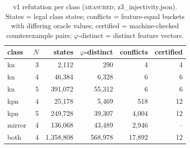 \documentclass[conference]{IEEEtran}
\newcommand{\tierm}{\textsc{measured}}
\begin{document}
\begin{table}[t]
\caption{v1 refutation per class (\tierm{};
z3\_injectivity.json). States = legal class states; conflicts = feature-equal
buckets with differing oracle values; certified = machine-checked
counterexample pairs; $\varphi$-distinct = distinct feature vectors.}
\label{tab:v1}
\centering
\footnotesize
\setlength{\tabcolsep}{3.2pt}
\begin{tabular}{lrrrrr}
\toprule
class & $N$ & states & $\varphi$-distinct & conflicts & certified \\
\midrule
kn     & 3 & 2{,}112 & 290 & 4 & 4 \\
kn     & 4 & 46{,}384 & 6{,}328 & 6 & 6 \\
kn     & 5 & 391{,}072 & 55{,}312 & 6 & 6 \\
kpn    & 4 & 25{,}178 & 5{,}469 & 518 & 12 \\
kpn    & 5 & 249{,}728 & 39{,}307 & 4{,}004 & 12 \\
mirror & 4 & 136{,}068 & 43{,}489 & 2{,}946 & -- \\
both   & 4 & 1{,}358{,}808 & 568{,}978 & 17{,}892 & 12 \\
\bottomrule
\end{tabular}
\end{table}
\end{document}
